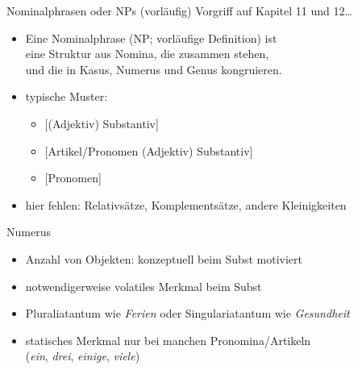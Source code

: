 \begin{frame}
  {Nominalphrasen oder NPs (vorläufig)}
  \pause
  Vorgriff auf Kapitel 11 und 12\dots\\
  \pause
  \Halbzeile
  \begin{exe}
    \ex
    \begin{xlist}
      \pause
      \pause
    \end{xlist}
  \end{exe}
  \pause
  \begin{itemize}[<+->]
    \item \alert{Eine Nominalphrase (NP; vorläufige Definition) ist\\
      eine Struktur aus Nomina, die zusammen stehen,\\
      und die in Kasus, Numerus und Genus kongruieren.}
      \Halbzeile
    \item typische Muster:
      \begin{itemize}
        \item{[(Adjektiv) Substantiv]}
        \item{[Artikel\slash Pronomen (Adjektiv) Substantiv]}
        \item{[Pronomen]}
      \end{itemize}
      \Halbzeile
    \item hier fehlen: Relativsätze, Komplementsätze, andere Kleinigkeiten
  \end{itemize}
\end{frame}

\begin{frame}
  {Numerus}
  \pause
  \begin{exe}
    \ex
    \begin{xlist}
      \pause
    \end{xlist}
    \pause
    \ex
    \begin{xlist}
      \pause
    \end{xlist}
  \end{exe}
  \pause
  \Halbzeile
  \begin{itemize}[<+->]
    \item \alert{Anzahl von Objekten}: konzeptuell beim Subst motiviert
    \item notwendigerweise volatiles Merkmal beim Subst
    \item Pluraliatantum wie \textit{Ferien} oder Singulariatantum wie \textit{Gesundheit}
    \item statisches Merkmal nur bei manchen Pronomina\slash Artikeln\\
      (\textit{ein}, \textit{drei}, \textit{einige}, \textit{viele})
  \end{itemize}
\end{frame}


